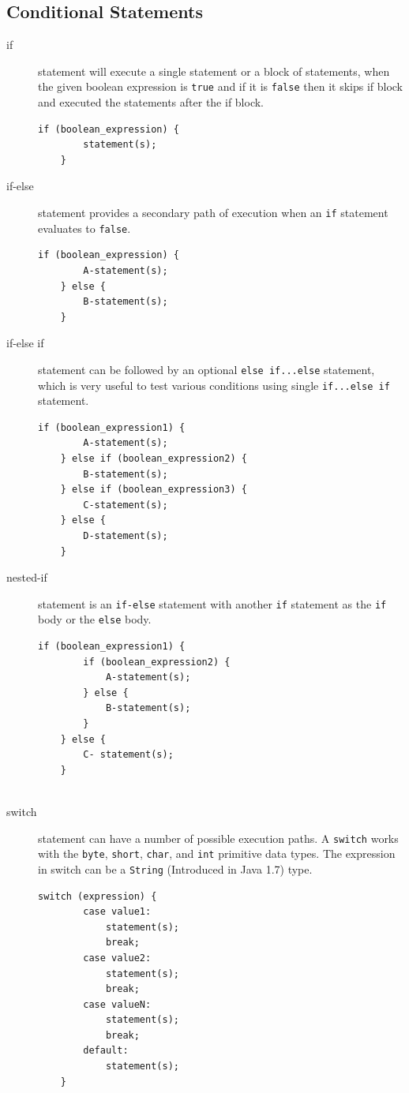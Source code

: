 \documentclass[11pt,a4paper]{article}
\begin{document}
\subsection*{Conditional Statements}
\begin{description}
\item [if] statement will execute a single statement or a block of statements, when the given boolean expression is \lstinline!true! and if it is \lstinline!false! then it skips if block and executed the statements after the if block.
\begin{lstlisting}[numbers=none]
    if (boolean_expression) {
        statement(s);
    }

\end{lstlisting}

\item [if-else] statement provides a secondary path of execution when an \lstinline!if! statement evaluates to \lstinline!false!.
\begin{lstlisting}[numbers=none]
    if (boolean_expression) {
        A-statement(s);
    } else {
        B-statement(s);
    }
\end{lstlisting} 

\item [if-else if] statement can be followed by an optional \lstinline!else if...else! statement, which is very useful to test various conditions using single \lstinline!if...else if! statement.

\begin{lstlisting}[numbers=none]
    if (boolean_expression1) {
        A-statement(s);
    } else if (boolean_expression2) {
        B-statement(s);
    } else if (boolean_expression3) {
        C-statement(s);
    } else {
        D-statement(s);
    }

\end{lstlisting} 
\item [nested-if] statement is an \lstinline!if-else! statement with another \lstinline!if! statement as the \lstinline!if! body or the \lstinline!else! body.

\begin{lstlisting}[numbers=none]
    if (boolean_expression1) {
        if (boolean_expression2) {
            A-statement(s);
        } else {
            B-statement(s);
        }
    } else {
        C- statement(s);
    }
   
\end{lstlisting}

\item [switch] statement can have a number of possible execution paths. A \lstinline!switch! works with the \lstinline!byte!, \lstinline!short!, \lstinline!char!, and \lstinline!int! primitive data types. The expression in switch can be a \lstinline!String! (Introduced in Java 1.7) type.

\begin{lstlisting}[numbers=none]
    switch (expression) {
        case value1:
            statement(s);
            break;
        case value2:
            statement(s);
            break;
        case valueN:
            statement(s);
            break;
        default:
            statement(s);
    }   
\end{lstlisting}
\end{description}
\end{document}
